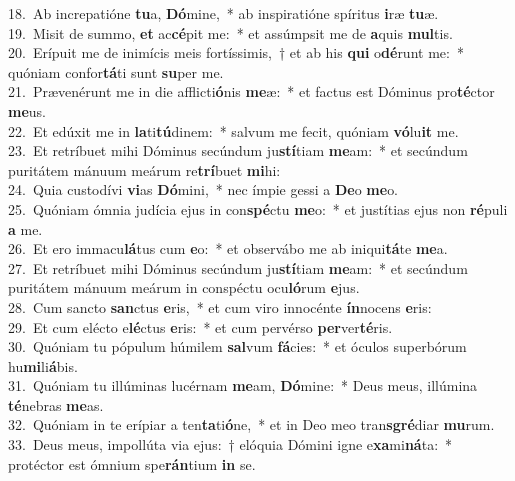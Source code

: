 {18.~}Ab increpatióne \textbf{tu}a, \textbf{Dó}mine,~* ab inspiratióne spíritus \textbf{i}ræ \textbf{tu}æ.\\
{19.~}Misit de summo, \textbf{et} ac\textbf{cé}pit me:~* et assúmpsit me de \textbf{a}quis \textbf{mul}tis.\\
{20.~}Erípuit me de inimícis meis fortíssimis,~† et ab his \textbf{qui} o\textbf{dé}runt me:~* quóniam confor\textbf{tá}ti sunt \textbf{su}per me.\\
{21.~}Prævenérunt me in die afflicti\textbf{ó}nis \textbf{me}æ:~* et factus est Dóminus pro\textbf{té}ctor \textbf{me}us.\\
{22.~}Et edúxit me in \textbf{la}ti\textbf{tú}dinem:~* salvum me fecit, quóniam \textbf{vó}lu\textbf{it} me.\\
{23.~}Et retríbuet mihi Dóminus secúndum ju\textbf{stí}tiam \textbf{me}am:~* et secúndum puritátem mánuum meárum re\textbf{trí}buet \textbf{mi}hi:\\
{24.~}Quia custodívi \textbf{vi}as \textbf{Dó}mini,~* nec ímpie gessi a \textbf{De}o \textbf{me}o.\\
{25.~}Quóniam ómnia judícia ejus in con\textbf{spé}ctu \textbf{me}o:~* et justítias ejus non \textbf{ré}puli \textbf{a} me.\\
{26.~}Et ero immacu\textbf{lá}tus cum \textbf{e}o:~* et observábo me ab iniqui\textbf{tá}te \textbf{me}a.\\
{27.~}Et retríbuet mihi Dóminus secúndum ju\textbf{stí}tiam \textbf{me}am:~* et secúndum puritátem mánuum meárum in conspéctu ocu\textbf{ló}rum \textbf{e}jus.\\
{28.~}Cum sancto \textbf{san}ctus \textbf{e}ris,~* et cum viro innocénte \textbf{ín}nocens \textbf{e}ris:\\
{29.~}Et cum elécto e\textbf{lé}ctus \textbf{e}ris:~* et cum pervérso \textbf{per}ver\textbf{té}ris.\\
{30.~}Quóniam tu pópulum húmilem \textbf{sal}vum \textbf{fá}cies:~* et óculos superbórum hu\textbf{mi}li\textbf{á}bis.\\
{31.~}Quóniam tu illúminas lucérnam \textbf{me}am, \textbf{Dó}mine:~* Deus meus, illúmina \textbf{té}nebras \textbf{me}as.\\
{32.~}Quóniam in te erípiar a ten\textbf{ta}ti\textbf{ó}ne,~* et in Deo meo tran\textbf{sgré}diar \textbf{mu}rum.\\
{33.~}Deus meus, impollúta via ejus:~† elóquia Dómini igne e\textbf{xa}mi\textbf{ná}ta:~* protéctor est ómnium spe\textbf{rán}tium \textbf{in} se.\\
